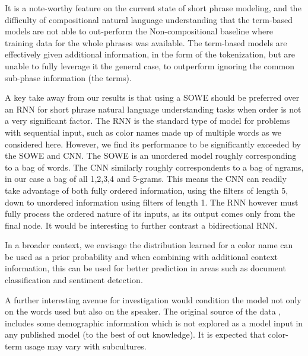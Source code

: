 \documentclass[]{clv3}
\newcommand{\textcite}{\citet}
\newcommand{\empmodel}{Non-compositional baseline}
\begin{document}
It is a note-worthy feature on the current state of short phrase modeling,
and the difficulty of compositional natural language understanding
that the term-based models are not able to out-perform the \empmodel{} where training data for the whole phrases was available.
The term-based models are effectively given additional information, in the form of the tokenization, but are unable to fully leverage it the general case, to outperform ignoring the common sub-phase information (the terms).



A key take away from our results is that using a SOWE should be preferred over an RNN for short phrase natural language understanding tasks when order is not a very significant factor.
The RNN is the standard type of model for problems with sequential input, such as color names made up of multiple words as we considered here.
However, we find its performance to be significantly exceeded by the SOWE and CNN.
The SOWE is an unordered model roughly corresponding to a bag of words.
The CNN similarly roughly correspondents to a bag of ngrams, in our case a bag of all 1,2,3,4 and 5-grams.
This means the CNN can readily take advantage of both fully ordered information, using the filters of length 5, down to unordered information using  filters of length 1.
The RNN however must fully process the ordered nature of its inputs, as its output comes only from the final node.
It would be interesting to further contrast a bidirectional RNN.

In a broader context, we envisage the distribution learned for a color name can be used as a prior probability and when combining with additional context information, this can be used for better prediction in areas such as document classification and sentiment detection.

A further interesting avenue for investigation would condition the model not only on the words used but also on the speaker.
The original source of the data \textcite{Munroe2010XKCDdataset}, includes some demographic information which is not explored as a model input in any  published model (to the best of out knowledge).
It is expected that color-term usage may vary with subcultures.


\clearpage


\clearpage
\appendix

\end{document}
